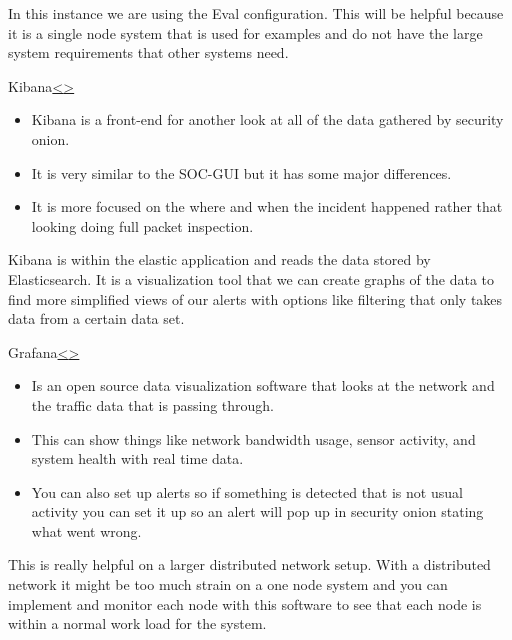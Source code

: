 \documentclass[12pt]{article}
\newenvironment{instructionblock}{\Large\bgroup}{\egroup}
\newcommand{\bi}{\begin{itemize}}
\newcommand{\ei}{\end{itemize}}
\begin{document}
\item In this instance we are using the Eval configuration. This will be helpful because it is a single node system that is used for examples and do not have the large system requirements that other systems need.

\pagebreak
\begin{slide}{Kibana}{\hyperref[slide 9]{\textless}\hyperref[slide 11]{\textgreater}}
	\begin{instructionblock}\
		\bi
			\item Kibana is a front-end for another look at all of the data gathered by security onion.
			\item It is very similar to the SOC-GUI but it has some major differences.
			\item It is more focused on the where and when the incident happened rather that looking doing full packet inspection.
		\ei
	\end{instructionblock}
\end{slide}

\vfill

\item Kibana is within the elastic application and reads the data stored by Elasticsearch. It is a visualization tool that we can create graphs of the data to find more simplified views of our alerts with options like filtering that only takes data from a certain data set.

\pagebreak
\begin{slide}{Grafana}{\hyperref[slide 10]{\textless}\hyperref[slide 12]{\textgreater}}
	\begin{instructionblock}
		\bi 
			\item Is an open source data visualization software that looks at the network and the traffic data that is passing through.
			\item This can show things like network bandwidth usage, sensor activity, and system health with real time data.
            \item You can also set up alerts so if something is detected that is not usual activity you can set it up so an alert will pop up in security onion stating what went wrong.
		\ei 
		
	\end{instructionblock}
\end{slide}
\vfill

\item This is really helpful on a larger distributed network setup. With a distributed network it might be too much strain on a one node system and you can implement and monitor each node with this software to see that each node is within a normal work load for the system. 
\end{document}
